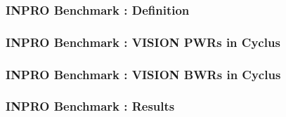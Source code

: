 
\begin{frame}
  \frametitle{INPRO Benchmark : Definition}
\end{frame}

\begin{frame}
  \frametitle{INPRO Benchmark : VISION PWRs in Cyclus}
\end{frame}

\begin{frame}
  \frametitle{INPRO Benchmark : VISION BWRs in Cyclus}
\end{frame}

\begin{frame}
  \frametitle{INPRO Benchmark : Results}
\end{frame}
